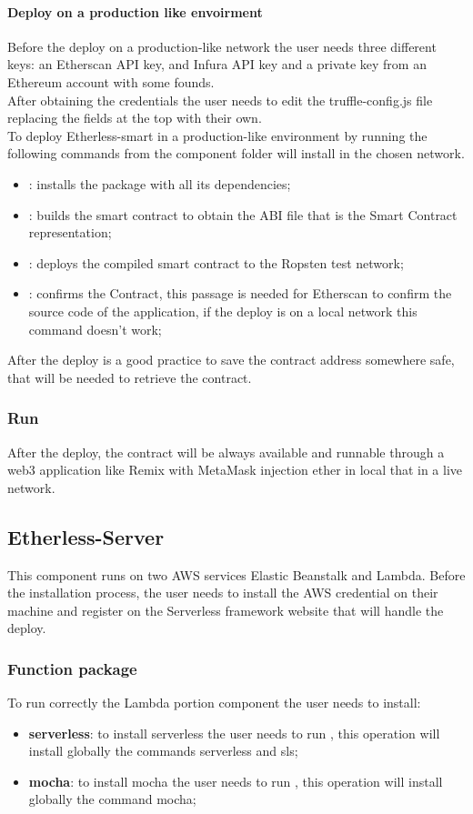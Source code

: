 \paragraph{Deploy on a production like envoirment}
Before the deploy on a production-like network the user needs three different keys: an Etherscan API
key, and Infura API key and a private key from an Ethereum account with some founds.\\
After obtaining the credentials the user needs to edit the truffle-config.js file replacing the fields at the top with their own. \\
To deploy Etherless-smart in a production-like environment
by running the following commands from the component folder will install in the chosen network.
\begin{itemize}
    \item {} : installs the package with all its dependencies;
    \item {}: builds the smart contract to obtain the ABI file that is the Smart Contract representation;
    \item {}: deploys the compiled smart contract to the Ropsten test network;
    \item {}: confirms the Contract, this passage is needed for Etherscan to confirm the source code of the application, if the deploy is on a local network this command doesn't work;
\end{itemize}
After the deploy is a good practice to save the contract address somewhere safe, that will be needed to retrieve the contract.
\subsubsection{Run}
After the deploy, the contract will be always available and runnable through a web3 application like Remix with MetaMask injection ether in local that in a live network.
\subsection{Etherless-Server}
This component runs on two AWS services Elastic Beanstalk and Lambda.
Before the installation process, the user needs to install the AWS credential on their
machine and register on the Serverless framework website that will handle the deploy.
\subsubsection{Function package}
To run correctly the Lambda portion component the user needs to install:
\begin{itemize}
    \item \textbf{serverless}: to install serverless the user needs to run , this operation will install globally the commands serverless and sls;
    \item \textbf{mocha}: to install mocha the user needs to run , this operation will install globally the command mocha;
\end{itemize}
